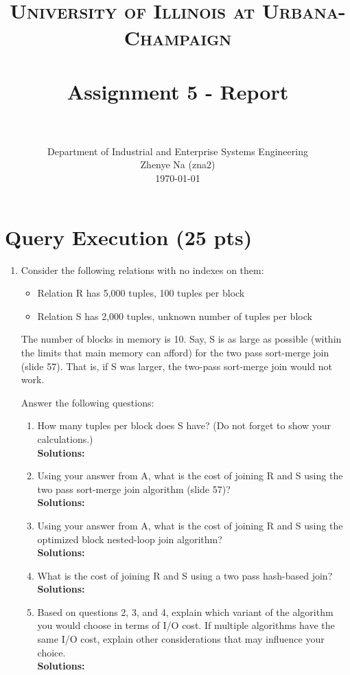 \documentclass[paper=a4, fontsize=11pt]{scrartcl}
\title{
		\usefont{OT1}{bch}{b}{n}
		\normalfont \normalsize \textsc{University of Illinois at Urbana-Champaign} \\ [25pt]
		\horrule{0.5pt} \\[0.4cm]
		\huge Assignment 5 - Report \\
		\horrule{2pt} \\[0.5cm]
}
\author{
		\normalfont 								\normalsize
        Department of Industrial and Enterprise Systems Engineering\\
        \normalsize Zhenye Na (zna2)\\[-3pt]		\normalsize
        \today
}
\date{}
\numberwithin{equation}{section}		%
\numberwithin{figure}{section}			%
\numberwithin{table}{section}				%
\begin{document}
\maketitle

\section{Query Execution (25 pts)}

\begin{enumerate}
	\item Consider the following relations with no indexes on them:\\
\begin{itemize}
\item Relation R has 5,000 tuples, 100 tuples per block
\item Relation S has 2,000 tuples, unknown number of tuples per block 
\end{itemize}

The number of blocks in memory is 10. Say, S is as large as possible (within the limits that main memory can afford) for the two pass sort-merge join (slide 57). That is, if S was larger, the two-pass sort-merge join would not work.

Answer the following questions:
\begin{enumerate}
\item How many tuples per block does S have? (Do not forget to show your calculations.)\\
\textbf{Solutions: }

\item Using your answer from A, what is the cost of joining R and S using the two pass sort-merge join algorithm (slide 57)?\\
\textbf{Solutions: }

\item Using your answer from A, what is the cost of joining R and S using the optimized block nested-loop join algorithm?\\
\textbf{Solutions: }

\item What is the cost of joining R and S using a two pass hash-based join?\\
\textbf{Solutions: }

\item Based on questions 2, 3, and 4, explain which variant of the algorithm you would choose in terms of I/O cost. If multiple algorithms have the same I/O cost, explain other considerations that may influence your choice.\\
\textbf{Solutions: }

\end{enumerate}
        
\end{enumerate}
\end{document}
